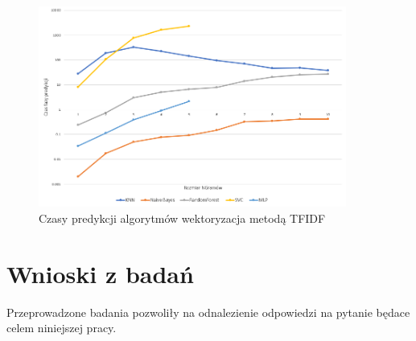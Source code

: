 \begin{figure}[h!]
    \centering
    \includegraphics[width=0.9\textwidth]{./Img/TFIDFPredict.png}
    \caption{Czasy predykcji algorytmów wektoryzacja metodą TFIDF}
\end{figure}

\section{Wnioski z badań}
Przeprowadzone badania pozwoliły na odnalezienie odpowiedzi na pytanie 
będace celem niniejszej pracy.
